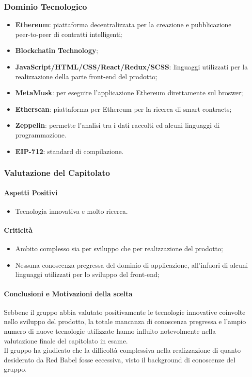 \subsubsection{Dominio Tecnologico}

\begin{itemize}
  \item \textbf{Ethereum}: piattaforma decentralizzata per la creazione e pubblicazione peer-to-peer di contratti intelligenti;
  \item \textbf{Blockchatin Technology};
  \item \textbf{JavaScript/HTML/CSS/React/Redux/SCSS}: linguaggi utilizzati per la realizzazione della parte front-end del prodotto;
  \item \textbf{MetaMusk}: per eseguire l'applicazione Ethereum direttamente sul broswer;
  \item \textbf{Etherscan}: piattaforma per Ethereum per la ricerca di smart contracts;
  \item \textbf{Zeppelin}: permette l'analisi tra i dati raccolti ed alcuni linguaggi di programmazione.
  \item \textbf{EIP-712}: standard di compilazione.
\end{itemize}

\subsubsection{Valutazione del Capitolato}
\paragraph{Aspetti Positivi}
\begin{itemize}
  \item Tecnologia innovativa e molto ricerca.
\end{itemize}

\paragraph{Criticità}
\begin{itemize}
  \item Ambito complesso sia per sviluppo che per realizzazione del prodotto;
  \item Nessuna conoscenza pregressa del dominio di applicazione, all'infuori di alcuni linguaggi utilizzati per lo sviluppo del front-end;
\end{itemize}
\paragraph{Conclusioni e Motivazioni della scelta}
Sebbene il gruppo abbia valutato positivamente le tecnologie innovative coinvolte nello sviluppo del prodotto, la totale mancanza di conoscenza pregressa e l'ampio numero di nuove tecnologie utilizzate hanno influito notevolmente nella valutazione finale del capitolato in esame. \\
Il gruppo ha giudicato che la difficoltà complessiva nella realizzazione di quanto desiderato da Red Babel fosse eccessiva, visto il background di conoscenze del gruppo.
